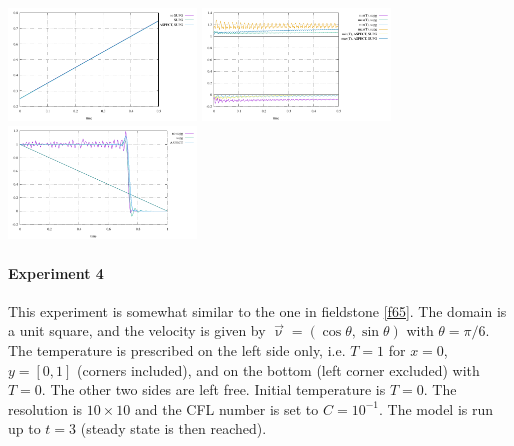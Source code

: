 \begin{center}
\includegraphics[width=5cm]{python_codes/fieldstone_43/results/experiment3/Q2/avrg_T.pdf}
\includegraphics[width=5cm]{python_codes/fieldstone_43/results/experiment3/Q2/stats_T.pdf}
\includegraphics[width=5cm]{python_codes/fieldstone_43/results/experiment3/Q2/temperature.pdf}
\end{center}





\paragraph{Experiment 4}

This experiment is somewhat similar to the one in fieldstone \ref{f65}.
The domain is a unit square, and the velocity is given by $\vec\upnu=(\cos \theta, \sin\theta)$ with $\theta=\pi/6$.
The temperature is prescribed on the left side only, i.e. $T=1$ for $x=0$, $y=[0,1]$ (corners included), and 
on the bottom (left corner excluded) with $T=0$. The other two sides are left free. Initial temperature is $T=0$.
The resolution is $10\times10$ and the CFL number is set to $C=10^{-1}$. The model is run up to $t=3$ (steady 
state is then reached). 

